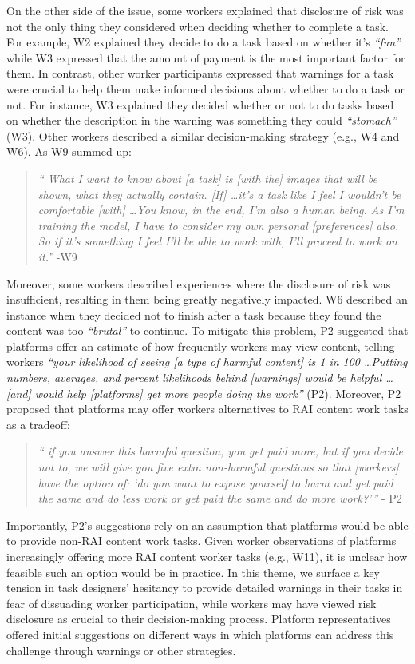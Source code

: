 On the other side of the issue, some workers explained that disclosure of risk was not the only thing they considered when deciding whether to complete a task. For example, W2 explained they decide to do a task based on whether it's \textit{``fun''} while W3 expressed that the amount of payment is the most important factor for them. In contrast, other worker participants expressed that warnings for a task were crucial to help them make informed decisions about whether to do a task or not. For instance, W3 explained they decided whether or not to do tasks based on whether the description in the warning was something they could \textit{``stomach''} (W3). Other workers described a similar decision-making strategy (e.g., W4 and W6). As W9 summed up: 
\begin{quote}
    \textit{`` What I want to know about [a task] is [with the] images that will be shown, what they actually contain. [If] \dots it's a task like I feel I wouldn't be comfortable [with] \dots You know, in the end, I'm also a human being. As I'm training the model, I have to consider my own personal [preferences] also. So if it's something I feel I'll be able to work with, I'll proceed to work on it.''} -W9
\end{quote}
Moreover, some workers described experiences where the disclosure of risk was insufficient, resulting in them being greatly negatively impacted. W6 described an instance when they decided not to finish after a task because they found the content was too \textit{``brutal''} to continue. 
To mitigate this problem, P2 suggested that platforms offer an estimate of how frequently workers may view content, telling workers \textit{``your likelihood of seeing [a type of harmful content] is 1 in 100 \dots Putting numbers, averages, and percent likelihoods behind [warnings] would be helpful \dots [and] would help [platforms] get more people doing the work''} (P2). Moreover, P2 proposed that platforms may offer workers alternatives to RAI content work tasks as a tradeoff: 
\begin{quote}
    \textit{`` if you answer this harmful question, you get paid more, but if you decide not to, we will give you five extra non-harmful questions so that [workers] have the option of: `do you want to expose yourself to harm and get paid the same and do less work or get paid the same and do more work?'''} - P2
\end{quote}
Importantly, P2's suggestions rely on an assumption that platforms would be able to provide non-RAI content work tasks. Given worker observations of platforms increasingly offering more RAI content worker tasks (e.g., W11), it is unclear how feasible such an option would be in practice. 
In this theme, we surface a key tension in task designers' hesitancy to provide detailed warnings in their tasks in fear of dissuading worker participation, while workers may have viewed risk disclosure as crucial to their decision-making process. Platform representatives offered initial suggestions on different ways in which platforms can address this challenge through warnings or other strategies. 

